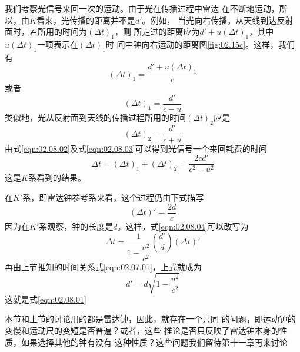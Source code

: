 我们考察光信号来回一次的运动。由于光在传播过程中雷达
在不断地运动，所以，由$K$看来，光传播的距离并不是$d'$。例如，
当光向右传播，从天线到达反射面时，若所用的时间为$\left(\Delta t\right)_1$，则
所走过的距离应为$ d ' + u \left( \Delta t \right) _ { 1 }$，其中$ u \left( \Delta t\right) _ { 1 } $一项表示在$\left(\Delta t\right)_1$时
间中钟向右运动的距离\lbr 图\ref{fig:02.15c}\rbr 。这样，我们有
\begin{equation*}
  \left( \Delta t \right) _ { 1 } = \frac { d ' + u \left(\Delta t\right)_1 } { c }
\end{equation*}
或者
\begin{equation}\label{eqn:02.08.02}
  \left( \Delta t \right) _ { 1 } = \frac { d ' } { c - u }
\end{equation}
类似地，光从反射面到天线的传播过程所用的时间$ \left(\Delta t\right)_2 $应是
\begin{equation}\label{eqn:02.08.03}
  \left( \Delta t \right) _ { 2 } = \frac { d ' } { c + u }
\end{equation}
由式\eqref{eqn:02.08.02}及式\eqref{eqn:02.08.03}可以得到光信号一个来回耗费的时间
\begin{equation}\label{eqn:02.08.04}
  \Delta t = \left( \Delta t \right) _ { 1 } + \left( \Delta t \right) _ { 2 } = \frac { 2 c d ' } { c ^ { 2 } - u ^ { 2 } }
\end{equation}
这是$K$系看到的结果。

在$K'$系，即雷达钟参考系来看，这个过程仍由下式描写
\begin{equation*}
  \left( \Delta t \right) ' = \frac { 2 d } { c }
\end{equation*}
因为在$K'$系观察，钟的长度是$d$。这样，式\eqref{eqn:02.08.04}可以改写为
\begin{equation*}
  \Delta t = \frac { 1 } { 1 - \dfrac { u ^ { 2 } } { c ^ { 2 } } } \left ( \frac { d ' } { d } \right) \left( \Delta t \right) '
\end{equation*}
再由上节推知的时间关系式\eqref{eqn:02.07.01}，上式就成为
\begin{equation*}
  d ' = d \sqrt { 1 - \frac { u ^ { 2 } } { c ^ { 2 } } }
\end{equation*}
\clearpage
\noindent 这就是式\eqref{eqn:02.08.01}

本节和上节的讨论用的都是雷达钟，因此，就存在一个共同
的问题，即运动钟的变慢和运动尺的变短是否普遍？或者，这些
推论是否只反映了雷达钟本身的性质，如果选择其他的钟有没有
这种性质？这些问题我们留待第十一章再来讨论
